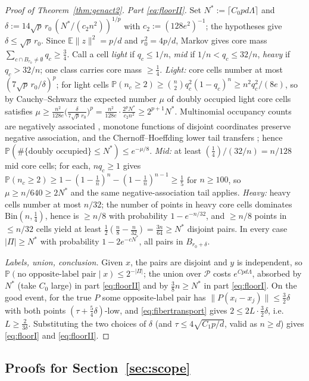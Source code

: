 \documentclass[11pt,reqno]{amsart}
\theoremstyle{plain}
\theoremstyle{definition}
\theoremstyle{remark}
\newcommand{\PP}{\mathbb{P}}
\newcommand{\EE}{\mathbb{E}}
\begin{document}
\begin{proof}[Proof of Theorem~\textup{\ref{thm:genact2}}]
\emph{Part \eqref{eq:floorII}.} Set $N^*:=\lceil C_0pd\Lambda\rceil$ and $\delta:=14\sqrt p\,r_0\,(N^*/(c_2n^2))^{1/p}$ with $c_2:=(128e^2)^{-1}$; the hypotheses give $\delta\le\sqrt p\,r_0$. Since $\EE\|z\|^2=p/d$ and $r_0^2=4p/d$, Markov gives core mass $\sum_{c\cap B_{r_0}\ne\emptyset}q_c\ge\tfrac34$. Call a cell \emph{light} if $q_c\le1/n$, \emph{mid} if $1/n<q_c\le32/n$, \emph{heavy} if $q_c>32/n$; one class carries core mass $\ge\tfrac14$.
\emph{Light:} core cells number at most $(7\sqrt p\,r_0/\delta)^p$; for light cells $\PP(n_c\ge2)\ge\binom n2q_c^2(1-q_c)^n\ge n^2q_c^2/(8e)$, so by Cauchy--Schwarz the expected number $\mu$ of doubly occupied light core cells satisfies $\mu\ge\frac{n^2}{128e}\bigl(\frac{\delta}{7\sqrt p\,r_0}\bigr)^p=\frac{n^2}{128e}\cdot\frac{2^pN^*}{c_2n^2}\ge2^{p+1}N^*$. Multinomial occupancy counts are negatively associated \cite{JDP}, monotone functions of disjoint coordinates preserve negative association, and the Chernoff--Hoeffding lower tail transfers \cite{DR}; hence $\PP(\#\{\text{doubly occupied}\}\le N^*)\le e^{-\mu/8}$.
\emph{Mid:} at least $(\tfrac14)/(32/n)=n/128$ mid core cells; for each, $nq_c\ge1$ gives $\PP(n_c\ge2)\ge1-(1-\tfrac1n)^n-(1-\tfrac1n)^{n-1}\ge\tfrac15$ for $n\ge100$, so $\mu\ge n/640\ge2N^*$ and the same negative-association tail applies.
\emph{Heavy:} heavy cells number at most $n/32$; the number of points in heavy core cells dominates $\mathrm{Bin}(n,\tfrac14)$, hence is $\ge n/8$ with probability $1-e^{-n/32}$, and $\ge n/8$ points in $\le n/32$ cells yield at least $\tfrac12(\tfrac n8-\tfrac n{32})=\tfrac{3n}{64}\ge N^*$ disjoint pairs.
In every case $|\Pi|\ge N^*$ with probability $1-2e^{-cN^*}$, all pairs in $B_{r_0+\delta}$.

\emph{Labels, union, conclusion.} Given $x$, the pairs are disjoint and $y$ is independent, so $\PP(\text{no opposite-label pair}\mid x)\le2^{-|\Pi|}$; the union over $\mathcal P$ costs $e^{Cpd\Lambda}$, absorbed by $N^*$ (take $C_0$ large) in part \eqref{eq:floorII} and by $\tfrac38n\ge N^*$ in part \eqref{eq:floorI}. On the good event, for the true $P$ some opposite-label pair has $\|P(x_i-x_j)\|\le\tfrac32\delta$ with both points $(\tau+\tfrac54\delta)$-low, and \eqref{eq:fibertransport} gives $2\le2L\cdot\tfrac32\delta$, i.e.\ $L\ge\tfrac2{3\delta}$. Substituting the two choices of $\delta$ (and $\tau\le4\sqrt{C_1p/d}$, valid as $n\ge d$) gives \eqref{eq:floorI} and \eqref{eq:floorII}.
\end{proof}

\subsection{Proofs for Section~\ref{sec:scope}}
\end{document}
